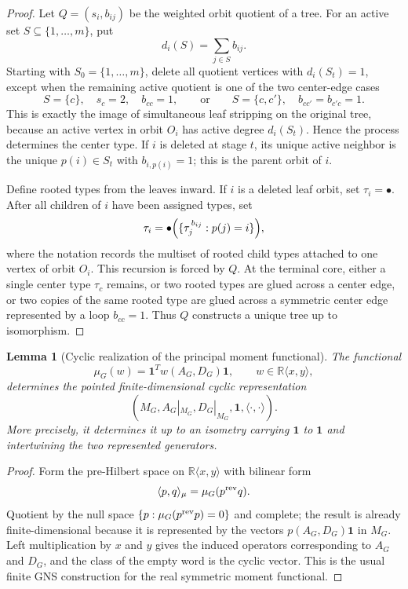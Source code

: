 \documentclass[a4paper,fleqn]{cas-sc}
\newtheorem{lemma}[theorem]{Lemma}
\theoremstyle{definition}
\theoremstyle{remark}
\newcommand{\one}{\mathbf 1}
\begin{document}
\begin{proof}
Let \(Q=(s_i,b_{ij})\) be the weighted orbit quotient of a tree.  For an active
set \(S\subseteq\{1,\ldots,m\}\), put
\[
        d_i(S)=\sum_{j\in S} b_{ij}.
\]
Starting with \(S_0=\{1,\ldots,m\}\), delete all quotient vertices with
\(d_i(S_t)=1\), except when the remaining active quotient is one of the two
center-edge cases
\[
        S=\{c\},\quad s_c=2,\quad b_{cc}=1,
        \qquad\text{or}\qquad
        S=\{c,c'\},\quad b_{cc'}=b_{c'c}=1.
\]
This is exactly the image of simultaneous leaf stripping on the original tree,
because an active vertex in orbit \(O_i\) has active degree \(d_i(S_t)\).  Hence
the process determines the center type.  If \(i\) is deleted at stage \(t\), its
unique active neighbor is the unique \(p(i)\in S_t\) with \(b_{i,p(i)}=1\); this
is the parent orbit of \(i\).

Define rooted types from the leaves inward.  If \(i\) is a deleted leaf orbit,
set \(\tau_i=\bullet\).  After all children of \(i\) have been assigned types,
set
\[
        \tau_i=\bullet\Bigl(\{\tau_j^{\,b_{ij}}:p(j)=i\}\Bigr),
\]
where the notation records the multiset of rooted child types attached to one
vertex of orbit \(O_i\).  This recursion is forced by \(Q\).  At the terminal
core, either a single center type \(\tau_c\) remains, or two rooted types are
glued across a center edge, or two copies of the same rooted type are glued
across a symmetric center edge represented by a loop \(b_{cc}=1\).  Thus \(Q\)
constructs a unique tree up to isomorphism.
\end{proof}

\begin{lemma}[Cyclic realization of the principal moment functional]
\label{lem:gns-principal-realization}
The functional
\[
        \mu_G(w)=\one^T w(A_G,D_G)\one,
        \qquad w\in\mathbb R\langle x,y\rangle,
\]
determines the pointed finite-dimensional cyclic representation
\[
        (M_G,A_G|_{M_G},D_G|_{M_G},\one,\langle\cdot,\cdot\rangle).
\]
More precisely, it determines it up to an isometry carrying $\one$ to $\one$ and
intertwining the two represented generators.
\end{lemma}

\begin{proof}
Form the pre-Hilbert space on $\mathbb R\langle x,y\rangle$ with bilinear
form
\[
        \langle p,q\rangle_\mu=\mu_G(p^{\rm rev}q).
\]
Quotient by the null space $\{p:\mu_G(p^{\rm rev}p)=0\}$ and complete; the result
is already finite-dimensional because it is represented by the vectors
$p(A_G,D_G)\one$ in $M_G$.  Left multiplication by $x$ and $y$ gives the induced
operators corresponding to $A_G$ and $D_G$, and the class of the empty word is
the cyclic vector.  This is the usual finite GNS construction for the real
symmetric moment functional.
\end{proof}
\end{document}
